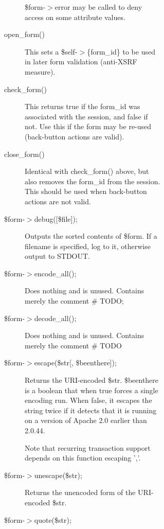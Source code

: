 \begin{description}
\begin{description}
\begin{description}
\begin{description}
\begin{description}
\begin{description}
\$form-$>$error may be called to deny access on some attribute values.


\item[{open\_form()}] \mbox{}

This sets a \$self-$>$\{form\_id\} to be used in later form validation (anti-XSRF 
measure).


\item[{check\_form()}] \mbox{}

This returns true if the form\_id was associated with the session, and false if 
not.  Use this if the form may be re-used (back-button actions are valid).


\item[{close\_form()}] \mbox{}

Identical with check\_form() above, but also removes the form\_id from the 
session.  This should be used when back-button actions are not valid.


\item[{\$form-$>$debug([\$file]);}] \mbox{}

Outputs the sorted contents of \$form.  If a filename is specified, log to it,
otherwise output to STDOUT.


\item[{\$form-$>$encode\_all();}] \mbox{}

Does nothing and is unused.  Contains merely the comment \# TODO;


\item[{\$form-$>$decode\_all();}] \mbox{}

Does nothing and is unused.  Contains merely the comment \# TODO


\item[{\$form-$>$escape(\$str[, \$beenthere]);}] \mbox{}

Returns the URI-encoded \$str.  \$beenthere is a boolean that when true forces a
single encoding run.  When false, it escapes the string twice if it detects
that it is running on a version of Apache 2.0 earlier than 2.0.44.



Note that recurring transaction support depends on this function escaping ','.


\item[{\$form-$>$unescape(\$str);}] \mbox{}

Returns the unencoded form of the URI-encoded \$str.


\item[{\$form-$>$quote(\$str);}] \mbox{}


\end{description}
\end{description}
\end{description}
\end{description}
\end{description}
\end{description}
